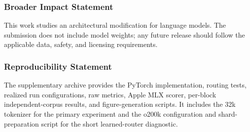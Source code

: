 \documentclass[10pt]{article}
\theoremstyle{definition}
\theoremstyle{remark}
\begin{document}
\subsubsection*{Broader Impact Statement}
This work studies an architectural modification for language models. The submission does not include model weights; any future release should follow the applicable data, safety, and licensing requirements.

\subsubsection*{Reproducibility Statement}
The supplementary archive provides the PyTorch implementation, routing tests, realized run configurations, raw metrics, Apple MLX scorer, per-block independent-corpus results, and figure-generation scripts. It includes the 32k tokenizer for the primary experiment and the o200k configuration and shard-preparation script for the short learned-router diagnostic.

\clearpage


\end{document}
